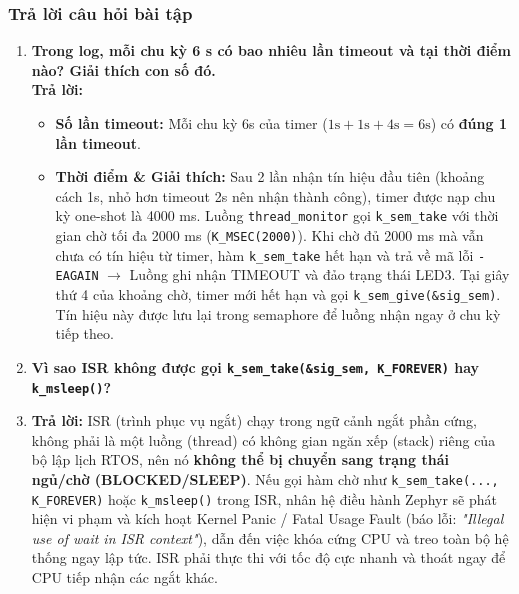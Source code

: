 \subsubsection{Trả lời câu hỏi bài tập}
\begin{enumerate}[label=(\alph*)]
    \item \textbf{Trong log, mỗi chu kỳ 6 s có bao nhiêu lần timeout và tại thời điểm nào? Giải thích con số đó.} \\
    \textbf{Trả lời:}
    \begin{itemize}
        \item \textbf{Số lần timeout:} Mỗi chu kỳ 6s của timer ($1\text{s} + 1\text{s} + 4\text{s} = 6\text{s}$) có \textbf{đúng 1 lần timeout}.
        \item \textbf{Thời điểm \& Giải thích:} Sau 2 lần nhận tín hiệu đầu tiên (khoảng cách 1s, nhỏ hơn timeout 2s nên nhận thành công), timer được nạp chu kỳ one-shot là 4000 ms. Luồng \texttt{thread\_monitor} gọi \texttt{k\_sem\_take} với thời gian chờ tối đa 2000 ms (\texttt{K\_MSEC(2000)}). Khi chờ đủ 2000 ms mà vẫn chưa có tín hiệu từ timer, hàm \texttt{k\_sem\_take} hết hạn và trả về mã lỗi \texttt{-EAGAIN} $\rightarrow$ Luồng ghi nhận TIMEOUT và đảo trạng thái LED3. Tại giây thứ 4 của khoảng chờ, timer mới hết hạn và gọi \texttt{k\_sem\_give(\&sig\_sem)}. Tín hiệu này được lưu lại trong semaphore để luồng nhận ngay ở chu kỳ tiếp theo.
    \end{itemize}
    
    \item \textbf{Vì sao ISR không được gọi \texttt{k\_sem\_take(\&sig\_sem, K\_FOREVER)} hay \texttt{k\_msleep()}?} \\
    \item 
    \textbf{Trả lời:} 
	ISR (trình phục vụ ngắt) chạy trong ngữ cảnh ngắt phần cứng, không phải là một luồng (thread) có không gian ngăn xếp (stack) riêng của bộ lập lịch RTOS, nên nó \textbf{không thể bị chuyển sang trạng thái ngủ/chờ (BLOCKED/SLEEP)}. Nếu gọi hàm chờ như \texttt{k\_sem\_take(..., K\_FOREVER)} hoặc \texttt{k\_msleep()} trong ISR, nhân hệ điều hành Zephyr sẽ phát hiện vi phạm và kích hoạt Kernel Panic / Fatal Usage Fault (báo lỗi: \textit{"Illegal use of wait in ISR context"}), dẫn đến việc khóa cứng CPU và treo toàn bộ hệ thống ngay lập tức. ISR phải thực thi với tốc độ cực nhanh và thoát ngay để CPU tiếp nhận các ngắt khác.
    

\end{enumerate}
